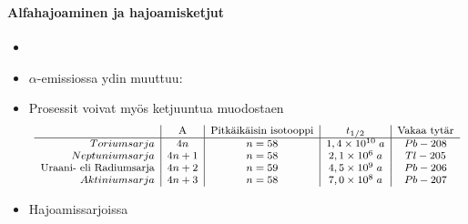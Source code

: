 \begin{frame}
\frametitle{\texorpdfstring{\culine[\sectiontitleulinecolor]{\sectiontitle}}{\sectiontitle} }
\framesubtitle{Alfahajoaminen ja hajoamisketjut}%
\appear{}

\begin{itemize}
	\item {}     

\item $\alpha$-emissiossa ydin muuttuu:   
\item Prosessit voivat myös ketjuuntua muodostaen  \vspace{2mm}
\[ 
\footnotesize
\begin{array}{r | c | c | c | c}
& \text {A} & \text {Pitkäikäisin isotooppi} & t_{1/2} & \text {Vakaa tytär} \\
\hline Toriumsarja & 4 n  	   & n=58  & 1,4 \times 10^{10} \;a & Pb-208 \\
 Neptuniumsarja & 4 n+1 & n=58 & 2,1 \times 10^{6} \;a & Tl-205\\
 \text{Uraani- eli Radiumsarja} & 4 n+2 & n=59 & 4,5 \times 10^{9} \;a & Pb-206\\
 Aktiniumsarja & 4 n+3 & n=58 & 7,0 \times 10^{8} \;a & Pb-207
\end{array}
\vspace{2mm}
\]

\item Hajoamissarjoissa    

\end{itemize}

\endofslide 
\end{frame}


